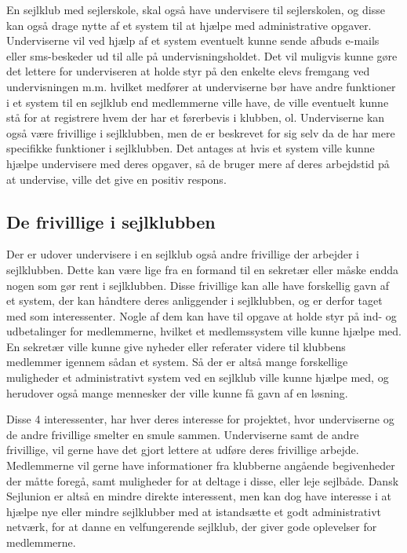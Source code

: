 En sejlklub med sejlerskole, skal også have undervisere til sejlerskolen, og disse kan også drage nytte af et system til
at hjælpe med administrative opgaver. Underviserne vil ved hjælp af et system eventuelt kunne sende afbuds e-mails eller sms-beskeder ud til alle på
undervisningsholdet. Det vil muligvis kunne gøre det lettere for underviseren at holde styr på den enkelte elevs fremgang
ved undervisningen m.m. hvilket medfører at underviserne bør have andre funktioner i et system til en sejlklub end medlemmerne
ville have, de ville eventuelt kunne stå for at registrere hvem der har et førerbevis i klubben, ol. Underviserne kan også
være frivillige i sejlklubben, men de er beskrevet for sig selv da de har mere specifikke funktioner i sejlklubben. 
Det antages at hvis et system ville kunne hjælpe undervisere med deres opgaver, så de bruger mere af deres arbejdstid på
at undervise, ville det give en positiv respons.

\subsection{De frivillige i sejlklubben}

Der er udover undervisere i en sejlklub også andre frivillige der arbejder i sejlklubben. Dette kan være lige fra en
formand til en sekretær eller måske endda nogen som gør rent i sejlklubben. Disse frivillige kan alle have forskellig
gavn af et system, der kan håndtere deres anliggender i sejlklubben, og er derfor taget med som interessenter. Nogle af
dem kan have til opgave at holde styr på ind- og udbetalinger for medlemmerne, hvilket et medlemssystem ville kunne
hjælpe med. En sekretær ville kunne give nyheder eller referater videre til klubbens medlemmer igennem sådan et
system. Så der er altså mange forskellige muligheder et administrativt system ved en sejlklub ville kunne hjælpe med, og
herudover også mange mennesker der ville kunne få gavn af en løsning.


Disse 4 interessenter, har hver deres interesse for projektet, hvor underviserne og de andre frivillige smelter en smule
sammen. Underviserne samt de andre frivillige, vil gerne have det gjort lettere at udføre deres frivillige arbejde.
Medlemmerne vil gerne have informationer fra klubberne angående begivenheder der
måtte foregå, samt muligheder for at deltage i disse, eller leje sejlbåde.
Dansk Sejlunion er altså en mindre direkte interessent, men kan dog have interesse i at hjælpe nye eller mindre
sejlklubber med at istandsætte et godt administrativt netværk, for at danne en velfungerende sejlklub, 
der giver gode oplevelser for medlemmerne.

